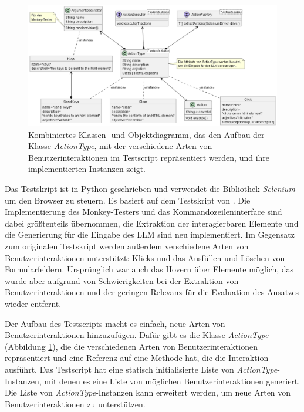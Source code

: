\begin{figure}
    \centering
    \includegraphics[width=\textwidth]{plantuml/ActionType.png}
    \caption{Kombiniertes Klassen- und Objektdiagramm, das den Aufbau der Klasse \textit{ActionType}, mit der verschiedene Arten von Benutzerinteraktionen im Testscript repräsentiert werden, und ihre implementierten Instanzen zeigt.}
    \label{fig:actiontype}
\end{figure}

Das Testskript ist in Python geschrieben und verwendet die Bibliothek \textit{Selenium} um den Browser zu steuern.
Es basiert auf dem Testskript von  \cite{GPT3Testing}.
Die Implementierung des Monkey-Testers und das Kommandozeileninterface sind dabei größtenteils übernommen, die Extraktion der interagierbaren Elemente und die Generierung für die Eingabe des LLM sind neu implementiert.
Im Gegensatz zum originalen Testskript werden außerdem verschiedene Arten von Benutzerinteraktionen unterstützt: Klicks und das Ausfüllen und Löschen von Formularfeldern.
Ursprünglich war auch das Hovern über Elemente möglich, das wurde aber aufgrund von Schwierigkeiten bei der Extraktion von Benutzerinteraktionen und der geringen Relevanz für die Evaluation des Ansatzes wieder entfernt.

Der Aufbau des Testscripts macht es einfach, neue Arten von Benutzerinteraktionen hinzuzufügen.
Dafür gibt es die Klasse \textit{ActionType} (Abbildung \ref{fig:actiontype}), die die verschiedenen Arten von Benutzerinteraktionen repräsentiert und eine Referenz auf eine Methode hat, die die Interaktion ausführt.
Das Testscript hat eine statisch initialisierte Liste von \textit{ActionType}-Instanzen, mit denen es eine Liste von möglichen Benutzerinteraktionen generiert.
Die Liste von \textit{ActionType}-Instanzen kann erweitert werden, um neue Arten von Benutzerinteraktionen zu unterstützen.

